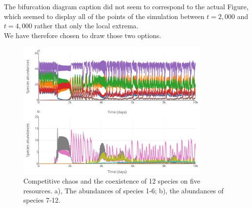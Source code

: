The bifurcation diagram caption did not seem to correspond to the actual 
Figure, which seemed to display all of the points of the simulation between 
$t=2,000$ and $t=4,000$ rather that only the local extrema.\\
We have therefore chosen to draw those two options. 
\begin{figure}[H]
\begin{center} 
 \includegraphics[width=0.86\textwidth]{../Code/Figures/Figure_4.pdf}
  \caption{Competitive chaos and the coexistence of 12 species on five 
resources. a), The abundances of species 1-6; b), the abundances of species 7-12.}
  \label{figures:Fig4}
\end{center}
  \end{figure}
